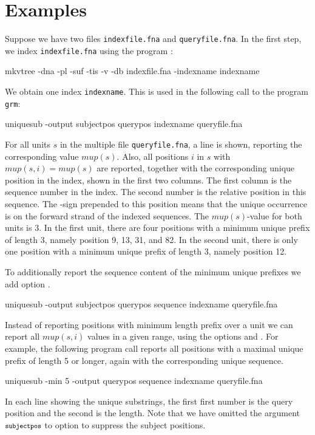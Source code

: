 \documentclass[12pt]{article}
\newcommand{\GRM}[0]{\texttt{grm}\xspace}
\newcommand{\Mup}[1]{\mathit{mup(s,#1)}}
\newcommand{\Lmin}[0]{\mathit{mup(s)}}
\newcommand{\EXECUTE}[1]{#1}
\begin{document}
\section{Examples}

Suppose we have two files \texttt{indexfile.fna} and
\texttt{queryfile.fna}. In the first step, we index \texttt{indexfile.fna}
using the program \MKV:

\EXECUTE{mkvtree -dna -pl -suf -tis -v -db indexfile.fna -indexname indexname}

We obtain one index \texttt{indexname}.
This is used in the following call to the program \GRM:

\EXECUTE{uniquesub -output subjectpos querypos indexname queryfile.fna}

For all units \(s\) in the multiple \Fasta file \texttt{queryfile.fna},
a line is shown, reporting the corresponding value \(\Lmin\).
Also, all positions \(i\) in \(s\) with \(\Mup{i}=\Lmin\)
are reported, together with the corresponding unique position
in the index, shown in the first two columns. The first column is the
sequence number in the index. The second number is the relative position
in this sequence. The -sign prepended to this position
means that the unique occurrence is on the forward strand of the
indexed sequences. The \(\Lmin\)-value for both units is 3. In the first
unit, there are four positions with a minimum unique prefix of length 3,
namely position 9, 13, 31, and 82.
In the second unit, there is only one position with a minimum unique prefix
of length 3, namely position 12.

To additionally report the sequence content of the
minimum unique prefixes we add option .

\EXECUTE{uniquesub -output subjectpos querypos sequence indexname queryfile.fna}

Instead of reporting positions with minimum length prefix over a
unit we can report all \(\Mup{i}\) values in a
given range, using the options  and .
For example, the following program call reports all positions
with a maximal unique prefix of length 5 or longer, again
with the corresponding unique sequence.

\EXECUTE{uniquesub -min 5 -output querypos sequence indexname queryfile.fna}

In each line showing the unique substrings, the first first number is the 
query position and the second is the length. Note that we have omitted
the argument $\mbox{\footnotesize \texttt{subjectpos}}$ to option 
to suppress the subject positions.
\end{document}
